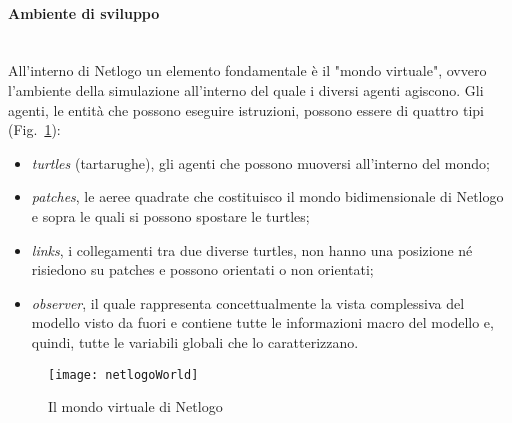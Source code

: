 \documentclass[12pt,a4paper,openright,twoside]{report}
\newcommand{\myparagraph}[1]{\paragraph{#1}\mbox{}\\}
\begin{document}
\myparagraph{Ambiente di sviluppo}

All'interno di Netlogo un elemento fondamentale è il "mondo virtuale", ovvero l'ambiente della simulazione all'interno del quale i diversi agenti agiscono. Gli agenti, le entità che possono eseguire istruzioni, possono essere di quattro tipi (Fig.~\ref{netlogoWorld}): \begin{itemize}
\item \emph{turtles} (tartarughe), gli agenti che possono muoversi all'interno del mondo;
\item \emph{patches}, le aeree quadrate che costituisco il mondo bidimensionale di Netlogo e sopra le quali si possono spostare le turtles;
\item \emph{links}, i collegamenti tra due diverse turtles, non hanno una posizione né risiedono su patches e possono orientati o non orientati;
\item \emph{observer}, il quale rappresenta concettualmente la vista complessiva del modello visto da fuori e contiene tutte le informazioni macro del modello e, quindi, tutte le variabili globali che lo caratterizzano.
\end{itemize}

\begin{figure}[htb]
	\begin{center}
	\texttt{[image: netlogoWorld]}
	\end{center}
	\caption{Il mondo virtuale di Netlogo}
  	\label{netlogoWorld}
\end{figure}
\end{document}
